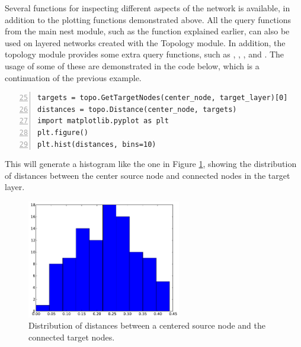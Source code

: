 Several functions for inspecting different aspects of the network is available, in addition to the plotting functions demonstrated above. All the query functions from the main nest module, such as the  function explained earlier, can also be used on layered networks created with the Topology module. In addition, the topology module provides some extra query functions, such as , , , and . The usage of some of these are demonstrated in the code below, which is a continuation of the previous example. 
\begin{lstlisting}[numbers=left, firstnumber=25]
targets = topo.GetTargetNodes(center_node, target_layer)[0]
distances = topo.Distance(center_node, targets)
import matplotlib.pyplot as plt
plt.figure()
plt.hist(distances, bins=10)
\end{lstlisting}
This will generate a histogram like the one in Figure \ref{fig:inspection}, showing the distribution of distances between the center source node and connected nodes in the target layer.

\begin{figure}[h]
  \centering
  \includegraphics[width=0.6\textwidth]{LayerInspection.pdf}
  \caption[Distribution of distances between source node and connected target nodes]{Distribution of distances between a centered source node and the connected target nodes.}
  \label{fig:inspection}
\end{figure} 



\clearchapter

